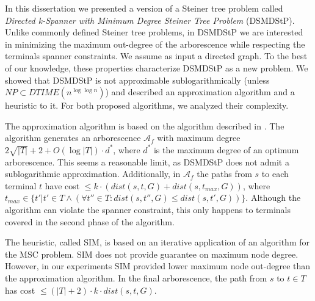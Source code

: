 \label{sec:conclusion}
\acresetall

In this dissertation we presented a version of a Steiner tree problem called \emph{Directed k-Spanner with Minimum Degree Steiner Tree Problem} (DSMDStP). 
Unlike commonly defined Steiner tree problems, in DSMDStP we are interested in minimizing 
the maximum out-degree of the arborescence while respecting the terminals spanner constraints. We assume as input a directed graph.
To the best of our knowledge, these properties characterize \mbox{DSMDStP} as a new problem.
We showed that \mbox{DSMDStP} is not approximable sublogarithmically (unless $NP \subset DTIME(n^{\log \log{n}})$) and described an approximation algorithm and a heuristic to it. 
For both proposed algorithms, we analyzed their complexity.

The approximation algorithm is based on the algorithm described in \cite{Elkin2006}. The algorithm generates an arborescence $\mathcal{A}_f$ 
with maximum degree $2\sqrt{|T|} + 2 + O(\log{|T|})\cdot d^*$, where $d^*$ is the maximum degree of an optimum arborescence.
This seems a reasonable limit, as 
DSMDStP does not admit a sublogarithmic approximation.
Additionally, in $\mathcal{A}_f$ the paths from $s$ to each terminal $t$ have cost $\le k \cdot ( dist(s,t,G) + dist(s,t_{max},G))$, where $t_{max} \in \{t' | t' \in T \land (\forall t'' \in T: dist(s,t'',G) \le dist(s,t',G))\}$. 
Although the algorithm can violate the spanner constraint, 
this only happens to terminals covered in the second phase of the algorithm. 

The heuristic, called SIM, is based on an iterative application of an algorithm for the MSC problem. SIM does not provide guarantee on maximum node degree. 
However, in our experiments SIM provided lower maximum node out-degree than the approximation algorithm. 
In the final arborescence, the path from $s$ to $t \in T$ has cost $ \le (|T| + 2) \cdot k \cdot dist(s,t,G)$. 

